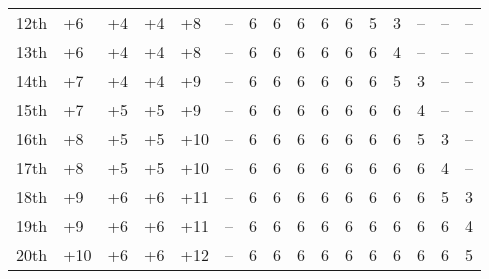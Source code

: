\begin{table}[htb]
\begin{tabular}{*{5}{l}p{1.5cm}*{10}{c}}
12th & +6 & +4 & +4 & +8 & -- & 6 & 6 & 6 & 6 & 6 & 5 & 3 & -- & -- & --\\
13th & +6 & +4 & +4 & +8 & -- & 6 & 6 & 6 & 6 & 6 & 6 & 4 & -- & -- & --\\
14th & +7 & +4 & +4 & +9 & -- & 6 & 6 & 6 & 6 & 6 & 6 & 5 & 3 & -- & --\\
15th & +7 & +5 & +5 & +9 & -- & 6 & 6 & 6 & 6 & 6 & 6 & 6 & 4 & -- & --\\
16th & +8 & +5 & +5 & +10 & -- & 6 & 6 & 6 & 6 & 6 & 6 & 6 & 5 & 3 & --\\
17th & +8 & +5 & +5 & +10 & -- & 6 & 6 & 6 & 6 & 6 & 6 & 6 & 6 & 4 & --\\
18th & +9 & +6 & +6 & +11 & -- & 6 & 6 & 6 & 6 & 6 & 6 & 6 & 6 & 5 & 3\\
19th & +9 & +6 & +6 & +11 & -- & 6 & 6 & 6 & 6 & 6 & 6 & 6 & 6 & 6 & 4\\
20th & +10 & +6 & +6 & +12 & -- & 6 & 6 & 6 & 6 & 6 & 6 & 6 & 6 & 6 & 5\\
\end{tabular}
\end{table}

